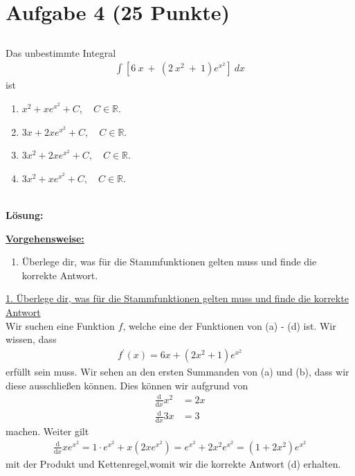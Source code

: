 \section*{Aufgabe 4 (25 Punkte)}
\vspace{0.4cm}
\subsection*{}
Das unbestimmte Integral
\begin{align*}
\int \left[ 6 \ x \  +  \ (2 \ x^2 \ + \ 1 ) e^{x^2} \right] \ dx
\end{align*}
ist
\renewcommand{\labelenumi}{(\alph{enumi})}
\begin{enumerate}
\item 
$x^2 + x e^{x^2} + C, \quad C \in \mathbb{R}$.
\item
$3x + 2x e^{x^2} + C , \quad C \in \mathbb{R}$.
\item
$3x^2 + 2x e^{x^2} + C , \quad C \in \mathbb{R}$.
\item
$3x^2 + x e^{x^2} + C , \quad C \in \mathbb{R}$.
\end{enumerate}
\ \\
\textbf{Lösung:}
\begin{mdframed}
\underline{\textbf{Vorgehensweise:}}
\renewcommand{\labelenumi}{\theenumi.}
\begin{enumerate}
\item Überlege dir, was für die Stammfunktionen gelten muss und finde die korrekte Antwort.
\end{enumerate}
\end{mdframed}

\underline{1. Überlege dir, was für die Stammfunktionen gelten muss und finde die korrekte Antwort}\\
Wir suchen eine Funktion $f$, welche eine der Funktionen von (a) - (d) ist.
Wir wissen, dass
\begin{align*}
f^\prime(x) = 6x +   (2  x^2 + 1 ) e^{x^2}
\end{align*}
erfüllt sein muss.
Wir sehen an den ersten Summanden von (a) und (b), dass wir diese ausschließen können.
Dies können wir aufgrund von
\begin{align*}
\frac{\mathrm{d}}{\mathrm{d} x} x^2  &= 2x\\
\frac{\mathrm{d}}{\mathrm{d} x} 3x &= 3
\end{align*}
machen.
Weiter gilt
\begin{align*}
\frac{\mathrm{d}}{\mathrm{d} x} x e^{x^2}
= 1 \cdot e^{x^2} + x (2x e^{x^2})
= e^{x^2} + 2x^2 e^{x^2}
= ( 1+ 2x^2) e^{x^2}
\end{align*}
mit der Produkt und Kettenregel,womit wir die korrekte Antwort (d) erhalten.

